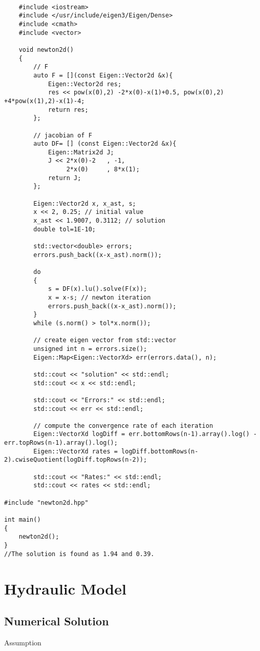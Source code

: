 \documentclass[xcolor=dvipsnames]{beamer}
\begin{document}
{
\begin{frame}[fragile,shrink=20]
	\lstset{language=C++}
\begin{lstlisting}

	#include <iostream>
	#include </usr/include/eigen3/Eigen/Dense>
	#include <cmath>
	#include <vector>

	void newton2d()
	{
		// F
		auto F = [](const Eigen::Vector2d &x){ 
	   		Eigen::Vector2d res;
			res << pow(x(0),2) -2*x(0)-x(1)+0.5, pow(x(0),2) +4*pow(x(1),2)-x(1)-4;
			return res;
		};

		// jacobian of F
		auto DF= [] (const Eigen::Vector2d &x){
			Eigen::Matrix2d J;
			J << 2*x(0)-2	, -1, 
			  	 2*x(0)		, 8*x(1);
		  	return J;
		};	

		Eigen::Vector2d x, x_ast, s;
		x << 2, 0.25; // initial value
		x_ast << 1.9007, 0.3112; // solution
	   	double tol=1E-10;

		std::vector<double> errors;
		errors.push_back((x-x_ast).norm());

		do
		{
			s = DF(x).lu().solve(F(x));
		   	x = x-s; // newton iteration
			errors.push_back((x-x_ast).norm());
		}
		while (s.norm() > tol*x.norm());

		// create eigen vector from std::vector
		unsigned int n = errors.size();
		Eigen::Map<Eigen::VectorXd> err(errors.data(), n);

		std::cout << "solution" << std::endl;
		std::cout << x << std::endl;
		
		std::cout << "Errors:" << std::endl;
		std::cout << err << std::endl;

		// compute the convergence rate of each iteration	
		Eigen::VectorXd logDiff = err.bottomRows(n-1).array().log() - err.topRows(n-1).array().log();
		Eigen::VectorXd rates = logDiff.bottomRows(n-2).cwiseQuotient(logDiff.topRows(n-2));
		
		std::cout << "Rates:" << std::endl;
		std::cout << rates << std::endl;

#include "newton2d.hpp"
  
int main()
{
	newton2d();
}
//The solution is found as 1.94 and 0.39.
\end{lstlisting}
\end{frame}

\section{Hydraulic Model}

\subsection{Numerical Solution}
\begin{frame}{Assumption}


\end{frame}}
\end{document}
